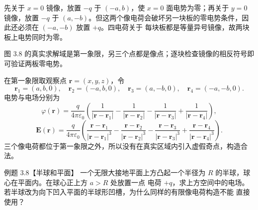 \begin{xesolution}
先关于 $x=0$ 镜像，放置 $-q$ 于 $(-a,b)$，使 $x=0$ 面电势为零；再关于 $y=0$ 镜像，放置 $-q$ 于
$(a,-b)$。但这两个像电荷会破坏另一块板的零电势条件，因此还必须在 $(-a,-b)$ 放置 $+q$。四电荷关于
每块板都是等量异号镜像，故两块板上电势同时为零。

图 3.8 的真实求解域是第一象限，另三个点都是像点；逐块检查镜像的相反符号即可验证两板零电势。

\cornerImagesFigure
{}

在第一象限取观察点 $\boldsymbol r=(x,y,z)$，令
\[
  \boldsymbol r_1=(a,b,0),\quad
  \boldsymbol r_2=(-a,b,0),\quad
  \boldsymbol r_3=(a,-b,0),\quad
  \boldsymbol r_4=(-a,-b,0).
\]
电势与电场分别为
\[
  \boxed{\varphi(\boldsymbol r)=\frac q{4\pi\varepsilon_0}
  \left(\frac1{|\boldsymbol r-\boldsymbol r_1|}
  -\frac1{|\boldsymbol r-\boldsymbol r_2|}
  -\frac1{|\boldsymbol r-\boldsymbol r_3|}
  +\frac1{|\boldsymbol r-\boldsymbol r_4|}\right)},
\]
\[
  \boxed{\boldsymbol E(\boldsymbol r)=\frac q{4\pi\varepsilon_0}
  \left(\frac{\boldsymbol r-\boldsymbol r_1}{|\boldsymbol r-\boldsymbol r_1|^3}
  -\frac{\boldsymbol r-\boldsymbol r_2}{|\boldsymbol r-\boldsymbol r_2|^3}
  -\frac{\boldsymbol r-\boldsymbol r_3}{|\boldsymbol r-\boldsymbol r_3|^3}
  +\frac{\boldsymbol r-\boldsymbol r_4}{|\boldsymbol r-\boldsymbol r_4|^3}\right)}.
\]
三个像电荷都位于第一象限之外，所以没有在真实区域内引入虚假奇点，构造合法。
\end{xesolution}

\begin{origexamplebox}{例题 3.8【半球和平面】}
一个无限大接地平面上方凸起一个半径为 $R$ 的半球，球心在平面内。在球心正上方 $a>R$ 处放置一点
电荷 $+q$，求上方空间中的电场。若半球改为向下凹入平面的半球形凹槽，为什么同样的有限像电荷构造不能
直接使用？
\emHemisphereQuestion
{}\label{fig:em-source-thirty-fourth-section-8}
\end{origexamplebox}

